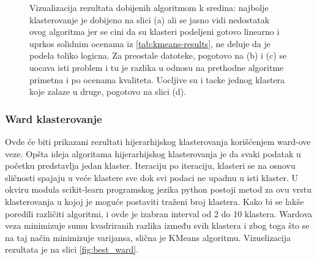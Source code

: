 \documentclass{article}
\begin{document}
\begin{figure}[H]
    \centering
    \caption{ Vizualizacija rezultata dobijenih algoritmom k sredina: najbolje klasterovanje je dobijeno na slici (a) ali se jasno vidi nedostatak ovog algoritma jer se cini da su klasteri podeljeni gotovo linearno i uprkos solidnim ocenama iz \ref{tab:kmeans-results}, ne deluje da je podela toliko logicna. Za preostale datoteke, pogotovo na (b) i (c) se uocava isti problem i tu je razlika u odnosu na prethodne algoritme primetna i po ocenama kvaliteta. Uocljive su i tacke jednog klastera koje zalaze u druge, pogotovo na slici (d). }
    \label{fig:best_kmeans}
\end{figure}


\subsubsection{Ward klasterovanje}

Ovde će biti prikazani rezultati hijerarhijskog klasterovanja korišćenjem ward-ove veze. Opšta ideja algoritama hijerarhijskog klasterovanja je da svaki podatak u početku predstavlja jedan klaster. Iteraciju po iteraciju, klasteri se na osnovu sličnosti spajaju u veće klastere sve dok svi podaci ne upadnu u isti klaster. U okviru modula scikit-learn programskog jezika python postoji metod za ovu vrstu klasterovanja u kojoj je moguće postaviti traženi broj klastera. Kako bi se lakše poredili različiti algoritmi, i ovde je izabran interval od 2 do 10 klastera. Wardova veza minimizuje sumu kvadriranih razlika između svih klastera i zbog toga što se na taj način minimizuje varijansa, slična je KMeans algoritmu. Vizuelizacija rezultata je na slici \ref{fig:best_ward}.
\end{document}
